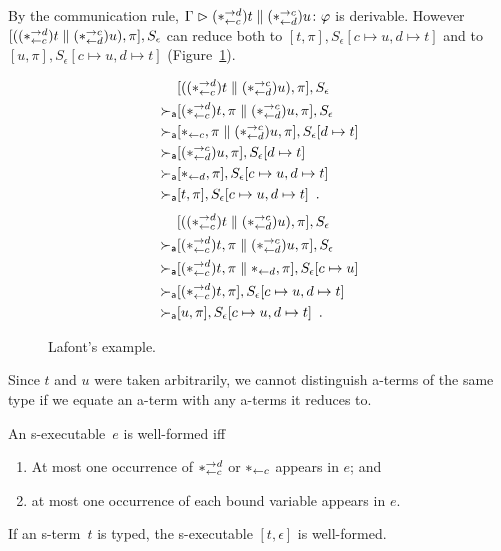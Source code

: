 By the communication rule,
$\G\tr\tj{(\comod c{d})t\conc(\comod {d} c)u}\phi$ is derivable.
However $[((\comod c{d})t\conc (\comod{d} c)u),
\pi],S_\epsilon$
can reduce both to $[t,\pi], S_\epsilon[c\mapsto u, d\mapsto t]$
and to $[u,\pi], S_\epsilon[c\mapsto u,d\mapsto t]$ (Figure~\ref{fig:lafont}).
\begin{figure}
 \begin{align*}
        & [((\comodL)t\conc (\comodR) u),\pi], S_\epsilon \\
  \ared & [(\comodL)t,\pi\conc (\comodR)u,\pi], S_\epsilon \\
  \ared & [\reader c, \pi\conc (\comodR)u,\pi], S_\epsilon[d\mapsto
  t] \\
  \ared & [(\comodR)u,\pi], S_\epsilon[d\mapsto t] \\
  \ared & [\reader d, \pi], S_\epsilon[c\mapsto u, d\mapsto t] \\
  \ared & [t,\pi], S_\epsilon[c\mapsto u,d\mapsto t]\enspace.
 \end{align*}
 \begin{align*}
        & [((\comodL)t\conc (\comodR) u),\pi], S_\epsilon \\
  \ared & [(\comodL)t,\pi\conc (\comodR)u,\pi], S_\epsilon \\
  \ared & [(\comodL)t,\pi\conc \reader d,\pi], S_\epsilon[c\mapsto u] \\
  \ared & [(\comodL)t,\pi], S_\epsilon[c\mapsto u,d\mapsto t] \\
  \ared & [u,\pi], S_\epsilon[c\mapsto u,d\mapsto t]\enspace.
 \end{align*}
 \caption{Lafont's example.}
 \label{fig:lafont}
\end{figure}
Since $t$ and $u$ were taken arbitrarily, we cannot distinguish a-terms
of the same type if we equate an a-term with any a-terms it reduces to.

\begin{definition}
 An s-executable~$e$ is well-formed iff
 \begin{enumerate}
  \item At most one occurrence of $\comodL$ or $\reader c$ appears in
	$e$; and
  \item at most one occurrence of each bound variable appears in $e$.
 \end{enumerate}
\end{definition}

\begin{proposition}
 If an s-term~$t$ is typed, the s-executable $[t,\epsilon]$ is well-formed.
\end{proposition}

